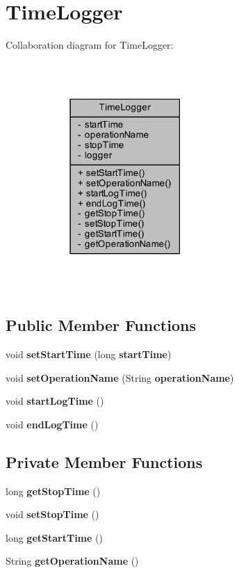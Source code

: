 \section{Time\+Logger}
\label{classch_1_1bfh_1_1gr33nopo55um_1_1enocean_1_1helper_1_1TimeLogger}


Collaboration diagram for Time\+Logger\+:\nopagebreak
\begin{figure}[H]
\begin{center}
\leavevmode
\includegraphics[width=198pt]{d4/daa/classch_1_1bfh_1_1gr33nopo55um_1_1enocean_1_1helper_1_1TimeLogger__coll__graph}
\end{center}
\end{figure}
\subsection*{Public Member Functions}
\begin{DoxyCompactItemize}
\item 
void {\bf set\+Start\+Time} (long {\bf start\+Time})
\item 
void {\bf set\+Operation\+Name} (String {\bf operation\+Name})
\item 
void {\bf start\+Log\+Time} ()
\item 
void {\bf end\+Log\+Time} ()
\end{DoxyCompactItemize}
\subsection*{Private Member Functions}
\begin{DoxyCompactItemize}
\item 
long {\bf get\+Stop\+Time} ()
\item 
void {\bf set\+Stop\+Time} ()
\item 
long {\bf get\+Start\+Time} ()
\item 
String {\bf get\+Operation\+Name} ()
\end{DoxyCompactItemize}
